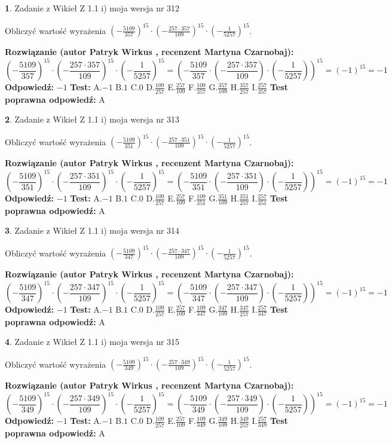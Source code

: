 \documentclass[12pt, a4paper]{article}
\theoremstyle{definition} %
\newtheorem{zad}{}
\newcommand{\zadStart}[1]{\begin{zad}#1\newline}
\newcommand{\zadStop}{\end{zad}}
\newcommand{\rozwStart}[2]{\noindent \textbf{Rozwiązanie (autor #1 , recenzent #2): }\newline}
\newcommand{\rozwStop}{\newline}
\newcommand{\odpStart}{\noindent \textbf{Odpowiedź:}\newline}
\newcommand{\odpStop}{\newline}
\newcommand{\testStart}{\noindent \textbf{Test:}\newline}
\newcommand{\testStop}{\newline}
\newcommand{\kluczStart}{\noindent \textbf{Test poprawna odpowiedź:}\newline}
\newcommand{\kluczStop}{\newline}
\begin{document}
\zadStart{Zadanie z Wikieł Z 1.1 i) moja wersja nr 312}

Obliczyć wartość wyrażenia $(-\frac{5109}{357})^{15} \cdot (-\frac{257 \cdot 357}{109})^{15} \cdot (-\frac{1}{5257})^{15}$.
\zadStop
\rozwStart{Patryk Wirkus}{Martyna Czarnobaj}
$$(-\frac{5109}{357})^{15} \cdot (-\frac{257 \cdot 357}{109})^{15} \cdot (-\frac{1}{5257})^{15} = (-\frac{5109}{357} \cdot (-\frac{257 \cdot 357}{109}) \cdot (-\frac{1}{5257}))^{15} = (-1)^{15} = -1$$
\rozwStop
\odpStart
$-1$
\odpStop
\testStart
A.$-1$ B.$1$ C.$0$ D.$\frac{109}{257}$ E.$\frac{257}{109}$
F.$\frac{109}{357}$ G.$\frac{357}{109}$
H.$\frac{357}{257}$
I.$\frac{257}{357}$
\testStop
\kluczStart
A
\kluczStop



\zadStart{Zadanie z Wikieł Z 1.1 i) moja wersja nr 313}

Obliczyć wartość wyrażenia $(-\frac{5109}{351})^{15} \cdot (-\frac{257 \cdot 351}{109})^{15} \cdot (-\frac{1}{5257})^{15}$.
\zadStop
\rozwStart{Patryk Wirkus}{Martyna Czarnobaj}
$$(-\frac{5109}{351})^{15} \cdot (-\frac{257 \cdot 351}{109})^{15} \cdot (-\frac{1}{5257})^{15} = (-\frac{5109}{351} \cdot (-\frac{257 \cdot 351}{109}) \cdot (-\frac{1}{5257}))^{15} = (-1)^{15} = -1$$
\rozwStop
\odpStart
$-1$
\odpStop
\testStart
A.$-1$ B.$1$ C.$0$ D.$\frac{109}{257}$ E.$\frac{257}{109}$
F.$\frac{109}{351}$ G.$\frac{351}{109}$
H.$\frac{351}{257}$
I.$\frac{257}{351}$
\testStop
\kluczStart
A
\kluczStop



\zadStart{Zadanie z Wikieł Z 1.1 i) moja wersja nr 314}

Obliczyć wartość wyrażenia $(-\frac{5109}{347})^{15} \cdot (-\frac{257 \cdot 347}{109})^{15} \cdot (-\frac{1}{5257})^{15}$.
\zadStop
\rozwStart{Patryk Wirkus}{Martyna Czarnobaj}
$$(-\frac{5109}{347})^{15} \cdot (-\frac{257 \cdot 347}{109})^{15} \cdot (-\frac{1}{5257})^{15} = (-\frac{5109}{347} \cdot (-\frac{257 \cdot 347}{109}) \cdot (-\frac{1}{5257}))^{15} = (-1)^{15} = -1$$
\rozwStop
\odpStart
$-1$
\odpStop
\testStart
A.$-1$ B.$1$ C.$0$ D.$\frac{109}{257}$ E.$\frac{257}{109}$
F.$\frac{109}{347}$ G.$\frac{347}{109}$
H.$\frac{347}{257}$
I.$\frac{257}{347}$
\testStop
\kluczStart
A
\kluczStop



\zadStart{Zadanie z Wikieł Z 1.1 i) moja wersja nr 315}

Obliczyć wartość wyrażenia $(-\frac{5109}{349})^{15} \cdot (-\frac{257 \cdot 349}{109})^{15} \cdot (-\frac{1}{5257})^{15}$.
\zadStop
\rozwStart{Patryk Wirkus}{Martyna Czarnobaj}
$$(-\frac{5109}{349})^{15} \cdot (-\frac{257 \cdot 349}{109})^{15} \cdot (-\frac{1}{5257})^{15} = (-\frac{5109}{349} \cdot (-\frac{257 \cdot 349}{109}) \cdot (-\frac{1}{5257}))^{15} = (-1)^{15} = -1$$
\rozwStop
\odpStart
$-1$
\odpStop
\testStart
A.$-1$ B.$1$ C.$0$ D.$\frac{109}{257}$ E.$\frac{257}{109}$
F.$\frac{109}{349}$ G.$\frac{349}{109}$
H.$\frac{349}{257}$
I.$\frac{257}{349}$
\testStop
\kluczStart
A
\kluczStop
\end{document}
